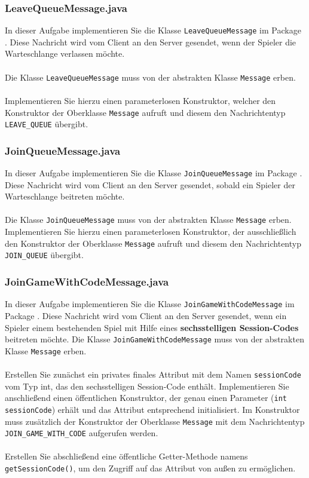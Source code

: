 \documentclass[12pt]{article}
\begin{document}
\subsubsection*{LeaveQueueMessage.java}

In dieser Aufgabe implementieren Sie die Klasse \texttt{LeaveQueueMessage} im Package . 
Diese Nachricht wird vom Client an den Server gesendet, wenn der Spieler die Warteschlange verlassen möchte.
\\ \\
Die Klasse \texttt{LeaveQueueMessage} muss von der abstrakten Klasse \texttt{Message} erben.
\\ \\
Implementieren Sie hierzu einen parameterlosen Konstruktor, welcher den Konstruktor der Oberklasse \texttt{Message} 
aufruft und diesem den Nachrichtentyp \texttt{LEAVE\_QUEUE} übergibt.

\subsubsection*{JoinQueueMessage.java}

In dieser Aufgabe implementieren Sie die Klasse \texttt{JoinQueueMessage} im Package . 
Diese Nachricht wird vom Client an den Server gesendet, sobald ein Spieler der Warteschlange beitreten möchte. 
\\ \\
Die Klasse \texttt{JoinQueueMessage} muss von der abstrakten Klasse \texttt{Message} erben. 
Implementieren Sie hierzu einen parameterlosen Konstruktor, 
der ausschließlich den Konstruktor der Oberklasse \texttt{Message} aufruft 
und diesem den Nachrichtentyp \texttt{JOIN\_QUEUE} übergibt.

\subsubsection*{JoinGameWithCodeMessage.java}

In dieser Aufgabe implementieren Sie die Klasse \texttt{JoinGameWithCodeMessage} im Package . 
Diese Nachricht wird vom Client an den Server gesendet, wenn ein Spieler einem bestehenden Spiel 
mit Hilfe eines \textbf{sechsstelligen Session-Codes} beitreten möchte. 
Die Klasse \texttt{JoinGameWithCodeMessage} muss von der abstrakten Klasse \texttt{Message} erben.
\\ \\
Erstellen Sie zunächst ein privates finales Attribut mit dem Namen \texttt{sessionCode} vom Typ int, 
das den sechsstelligen Session-Code enthält. 
Implementieren Sie anschließend einen öffentlichen Konstruktor, der genau einen Parameter (\texttt{int sessionCode}) erhält 
und das Attribut entsprechend initialisiert. 
Im Konstruktor muss zusätzlich der Konstruktor der Oberklasse \texttt{Message} 
mit dem Nachrichtentyp \texttt{JOIN\_GAME\_WITH\_CODE} aufgerufen werden.
\\ \\
Erstellen Sie abschließend eine öffentliche Getter-Methode namens \texttt{getSessionCode()}, 
um den Zugriff auf das Attribut von außen zu ermöglichen.
\end{document}

